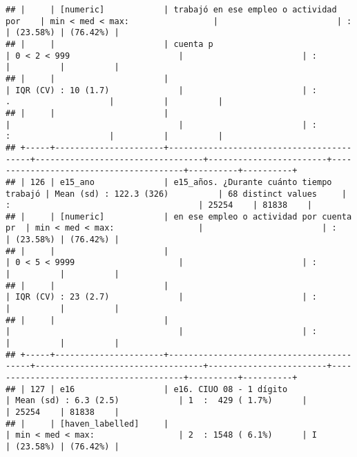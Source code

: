 \documentclass[]{article}
\begin{document}
\begin{verbatim}
## |     | [numeric]            | trabajó en ese empleo o actividad por    | min < med < max:                 |                        | :                                      | (23.58%) | (76.42%) |
## |     |                      | cuenta p                                 | 0 < 2 < 999                      |                        | :                                      |          |          |
## |     |                      |                                          | IQR (CV) : 10 (1.7)              |                        | :                 .                    |          |          |
## |     |                      |                                          |                                  |                        | :                 :                    |          |          |
## +-----+----------------------+------------------------------------------+----------------------------------+------------------------+----------------------------------------+----------+----------+
## | 126 | e15_ano              | e15_años. ¿Durante cuánto tiempo trabajó | Mean (sd) : 122.3 (326)          | 68 distinct values     | :                                      | 25254    | 81838    |
## |     | [numeric]            | en ese empleo o actividad por cuenta pr  | min < med < max:                 |                        | :                                      | (23.58%) | (76.42%) |
## |     |                      |                                          | 0 < 5 < 9999                     |                        | :                                      |          |          |
## |     |                      |                                          | IQR (CV) : 23 (2.7)              |                        | :                                      |          |          |
## |     |                      |                                          |                                  |                        | :                                      |          |          |
## +-----+----------------------+------------------------------------------+----------------------------------+------------------------+----------------------------------------+----------+----------+
## | 127 | e16                  | e16. CIUO 08 - 1 dígito                  | Mean (sd) : 6.3 (2.5)            | 1  :  429 ( 1.7%)      |                                        | 25254    | 81838    |
## |     | [haven_labelled]     |                                          | min < med < max:                 | 2  : 1548 ( 6.1%)      | I                                      | (23.58%) | (76.42%) |

\end{verbatim}
\end{document}
